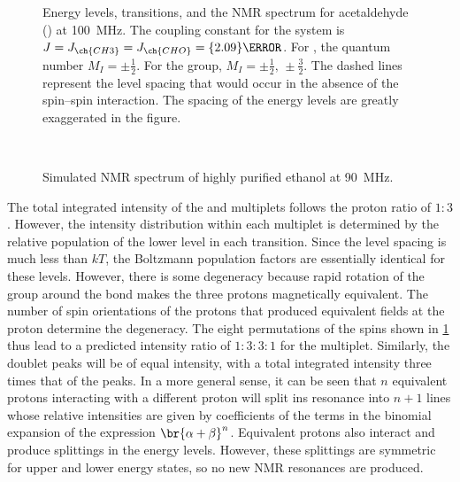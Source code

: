 \documentclass[nobib,nofonts,nols,nohyper]{tufte-handout}
\begin{document}
\begin{figure}[htb]
  \centering
  
  \caption{Energy levels, transitions, and the NMR spectrum for acetaldehyde () at \qty{100}{\MHz}. 
  The coupling constant for the system is \( {J = J_{\ch{CH3}} = J_{\ch{CHO}} = \qty{2.09}{\Hz}} \). 
  For , the quantum number \( {M_I = \pm\tfrac{1}{2}} \). For the  group, \( {M_I = \pm\tfrac{1}{2}, \, \pm\tfrac{3}{2}} \). 
  The dashed lines represent the level spacing that would occur in the absence of the spin--spin interaction.
  The spacing of the energy levels are greatly exaggerated in the figure.}
  \label{fig:spin_splitting}
\end{figure}  

\begin{figure}[htb]
  \centering
  
	\caption{Simulated NMR spectrum of highly purified ethanol at \qty{90}{\MHz}.}\
	\label{fig:EtOH_spectrum}
\end{figure}
The total integrated intensity of the  and  multiplets follows the proton ratio of \( 1{:}3 \). 
However, the intensity distribution within each multiplet is determined by the relative population of the lower level in each transition. 
Since the level spacing is much less than \( kT \), the Boltzmann population factors are essentially identical for these levels. 
However, there is some degeneracy because rapid rotation of the  group around the \ch{C-C} bond makes the three protons magnetically equivalent. 
The number of spin orientations of the  protons that produced equivalent fields at the  proton determine the degeneracy. 
The eight permutations of the  spins shown in \cref{fig:spin_splitting} thus lead to a predicted intensity ratio of \( 1{:}3{:}3{:}1 \) for the  multiplet. 
Similarly, the \ch{CH3} doublet peaks will be of equal intensity, with a total integrated intensity three times that of the \ch{CH} peaks. 
In a more general sense, it can be seen that \( n \) equivalent protons interacting with a different proton will split ins resonance into \( n + 1 \) lines whose relative intensities are given by coefficients of the terms in the binomial expansion of the expression \( \br{\alpha + \beta}^n \). 
Equivalent protons also interact and produce splittings in the energy levels. 
However, these splittings are symmetric for upper and lower energy states, so no new NMR resonances are produced. 
\end{document}
